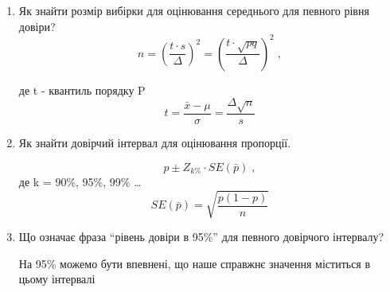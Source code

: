 \documentclass[12pt]{extarticle}
\begin{document}
\begin{enumerate}
\item  Як знайти розмір вибірки для оцінювання середнього для певного рівня довіри?
\[n=(\frac{t\cdot s}{\Delta})^2 = (\frac{t\cdot \sqrt{pq}}{\Delta})^2   \; ,\] 

де t - квантиль порядку P
\[  t = \frac{\bar{x}-\mu}{\sigma} = \frac{\Delta\sqrt{n}}{s} \]

\item  Як знайти довірчий інтервал для оцінювання пропорції.

\[ p \pm Z_{k\%} \cdot SE(\bar{p}) \;, \] де k = 90\%, 95\%, 99\% \ldots
\[SE(\bar{p}) = \sqrt{\frac{p(1-p)}{n}}\]

\item  Що означає фраза “рівень довіри в 95\%” для певного довірчого інтервалу?

На 95\% можемо бути впевнені, що наше справжнє значення міститься в цьому інтервалі

\end{enumerate}
\end{document}
